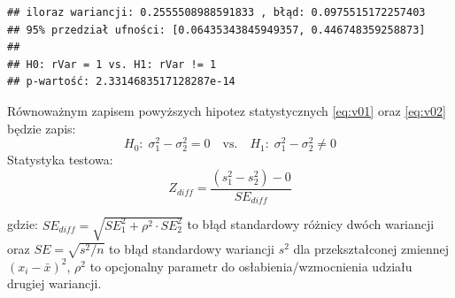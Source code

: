 \documentclass[polish,]{book}
\begin{document}
\begin{verbatim}
## iloraz wariancji: 0.2555508988591833 , błąd: 0.0975515172257403
## 95% przedział ufności: [0.06435343845949357, 0.446748359258873]
## 
## H0: rVar = 1 vs. H1: rVar != 1
## p-wartość: 2.3314683517128287e-14
\end{verbatim}

Równoważnym zapisem powyższych hipotez statystycznych \eqref{eq:v01} oraz \eqref{eq:v02} będzie zapis:
\begin{equation}
H_{0}:\;\sigma^2_1-\sigma^2_2=0\quad\textrm{vs.}\quad H_{1}:\;\sigma^2_1-\sigma^2_2\neq0
\label{eq:v04}
\end{equation}
Statystyka testowa:
\begin{equation}
Z_{diff}=\frac{(s^2_1-s^2_2)-0}{SE_{diff}}
\label{eq:v05}
\end{equation}

gdzie: \(SE_{diff}=\sqrt{SE_{1}^2+\rho^2\cdot SE_{2}^2}\) to błąd standardowy różnicy dwóch wariancji oraz \(SE=\sqrt{s^2/n}\) to błąd standardowy wariancji \(s^2\) dla przekształconej zmiennej \((x_i-\bar{x})^2\), \(\rho^2\) to opcjonalny parametr do osłabienia/wzmocnienia udziału drugiej wariancji.
\end{document}
